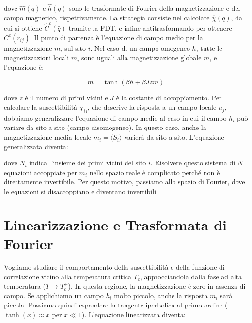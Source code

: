 dove $\hat{m}(\bar{q})$ e $\hat{h}(\bar{q})$ sono le trasformate di Fourier della magnetizzazione e del campo magnetico, rispettivamente. La strategia consiste nel calcolare $\hat{\chi}(\bar{q})$, da cui si ottiene $\hat{C}^c(\bar{q})$ tramite la FDT, e infine antitrasformando per ottenere $C^c(\bar{r}_{ij})$.
Il punto di partenza è l'equazione di campo medio per la magnetizzazione $m_i$ sul sito $i$. Nel caso di un campo omogeneo $h$, tutte le magnetizzazioni locali $m_i$ sono uguali alla magnetizzazione globale $m$, e l'equazione è:

\begin{equation} \label{eq:ch19_8}
m = \tanh(\beta h + \beta J z m)
\end{equation}

dove $z$ è il numero di primi vicini e $J$ è la costante di accoppiamento.
Per calcolare la suscettibilità $\chi_{ij}$, che descrive la risposta a un campo locale $h_j$, dobbiamo generalizzare l'equazione di campo medio al caso in cui il campo $h_i$ può variare da sito a sito (campo disomogeneo). In questo caso, anche la magnetizzazione media locale $m_i = \langle S_i \rangle$ varierà da sito a sito. L'equazione generalizzata diventa:

\vspace{0.5cm}
\noindent{}
\vspace{0.5cm}

dove $N_i$ indica l'insieme dei primi vicini del sito $i$.
Risolvere questo sistema di $N$ equazioni accoppiate per $m_i$ nello spazio reale è complicato perché non è direttamente invertibile. Per questo motivo, passiamo allo spazio di Fourier, dove le equazioni si disaccoppiano e diventano invertibili.


\section{Linearizzazione e Trasformata di Fourier}
Vogliamo studiare il comportamento della suscettibilità e della funzione di correlazione vicino alla temperatura critica $T_c$, approcciandola dalla fase ad alta temperatura ($T \rightarrow T_c^+$). In questa regione, la magnetizzazione è zero in assenza di campo.
Se applichiamo un campo $h_i$ molto piccolo, anche la risposta $m_i$ sarà piccola. Possiamo quindi espandere la tangente iperbolica al primo ordine ($\tanh(x) \approx x$ per $x \ll 1$). L'equazione linearizzata diventa:

